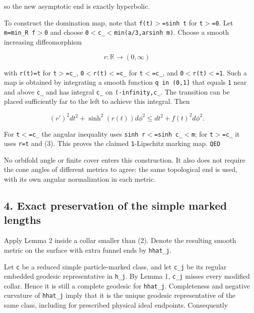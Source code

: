 \documentclass[11pt]{article}
\renewcommand{\textgreater}{\ensuremath{>}}
\renewcommand{\textless}{\ensuremath{<}}
\renewcommand{\textquotesingle}{\char39}
\begin{document}
so the new asymptotic end is exactly hyperbolic.

To construct the domination map, note that
\texttt{f(t)\textgreater{}=sinh\ t} for \texttt{t\textgreater{}=0}. Let
\texttt{m=min\_\allowbreak R\ f\textgreater{}0} and choose
\texttt{0\textless{}c\_\textless{}min(a/3,arsinh\ m)}. Choose a smooth
increasing diffeomorphism

\[
r:\mathbb R\longrightarrow(0,\infty)
\]

with \texttt{r(t)=t} for \texttt{t\textgreater{}=c\_},
\texttt{0\textless{}r(t)\textless{}=c\_} for
\texttt{t\textless{}=c\_}, and
\texttt{0\textless{}r\textquotesingle{}(t)\textless{}=1}. Such a map is
obtained by integrating a smooth function \texttt{q\ in\ (0,1{]}} that
equals \texttt{1} near and above \texttt{c\_} and has integral
\texttt{c\_} on \texttt{(-infinity,c\_\allowbreak 0{]}}. The transition can be
placed sufficiently far to the left to achieve this integral. Then

\[
(r')^2dt^2+\sinh^2(r(t))d\phi^2
\le dt^2+f(t)^2d\phi^2.
\tag{6}
\]

For \texttt{t\textless{}=c\_} the angular inequality uses
\texttt{sinh\ r\textless{}=sinh\ c\_\textless{}m}; for
\texttt{t\textgreater{}=c\_} it uses \texttt{r=t} and (3). This proves
the claimed \texttt{1}-Lipschitz marking map. \texttt{QED}

No orbifold angle or finite cover enters this construction. It also does
not require the cone angles of different metrics to agree: the same
topological end is used, with its own angular normalization in each
metric.

\subsection{4. Exact preservation of the simple marked
lengths}\label{exact-preservation-of-the-simple-marked-lengths}

Apply Lemma 2 inside a collar smaller than (2). Denote the resulting
smooth metric on the surface with extra funnel ends by \texttt{hhat\_\allowbreak j}.

Let \texttt{c} be a reduced simple particle-marked class, and let
\texttt{c\_\allowbreak j} be its regular embedded geodesic representative in
\texttt{h\_\allowbreak j}. By Lemma 1, \texttt{c\_\allowbreak j} misses every modified collar.
Hence it is still a complete geodesic for \texttt{hhat\_\allowbreak j}. Completeness
and negative curvature of \texttt{hhat\_\allowbreak j} imply that it is the unique
geodesic representative of the same class, including for prescribed
physical ideal endpoints. Consequently
\end{document}
